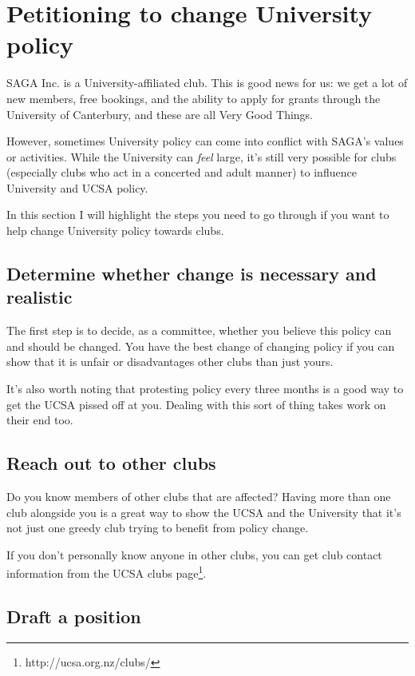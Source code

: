 \section{Petitioning to change University policy}

SAGA Inc. is a University-affiliated club. This is good news for us: we get a lot of new members, free bookings, and the ability to apply for grants through the University of Canterbury, and these are all Very Good Things.

However, sometimes University policy can come into conflict with SAGA's values or activities. While the University can \textit{feel} large, it's still very possible for clubs (especially clubs who act in a concerted and adult manner) to influence University and UCSA policy.

In this section I will highlight the steps you need to go through if you want to help change University policy towards clubs.

\subsection{Determine whether change is necessary and realistic}

The first step is to decide, as a committee, whether you believe this policy can and should be changed. You have the best change of changing policy if you can show that it is unfair or disadvantages other clubs than just yours.

It's also worth noting that protesting policy every three months is a good way to get the UCSA pissed off at you. Dealing with this sort of thing takes work on their end too.

\subsection{Reach out to other clubs}

Do you know members of other clubs that are affected? Having more than one club alongside you is a great way to show the UCSA and the University that it's not just one greedy club trying to benefit from policy change.

If you don't personally know anyone in other clubs, you can get club contact information from the UCSA clubs page\footnote{http://ucsa.org.nz/clubs/}.

\subsection{Draft a position}

